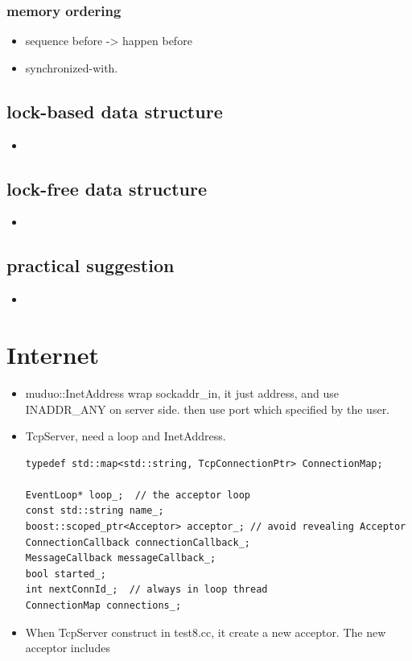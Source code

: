 \documentclass[a4paper,11pt,twoside]{book}
\begin{document}
\subsection{memory ordering}
\begin{itemize}
	\item sequence before -> happen before
	\item synchronized-with.
	
\end{itemize}


\section{lock-based data structure}
\begin{itemize}
	\item 
\end{itemize}

\section{lock-free data structure}
\begin{itemize}
	\item 
\end{itemize}

\section{practical suggestion}
\begin{itemize}
	\item 
\end{itemize}


\chapter{Internet}
\begin{itemize}
	\item muduo::InetAddress wrap sockaddr\_in, it just address, and use INADDR\_ANY on server side. then use port which specified by the user. 
	
	\item TcpServer, need a loop and InetAddress.
\begin{lstlisting}[numbers=none]
typedef std::map<std::string, TcpConnectionPtr> ConnectionMap;

EventLoop* loop_;  // the acceptor loop
const std::string name_;
boost::scoped_ptr<Acceptor> acceptor_; // avoid revealing Acceptor
ConnectionCallback connectionCallback_;
MessageCallback messageCallback_;
bool started_;
int nextConnId_;  // always in loop thread
ConnectionMap connections_;
\end{lstlisting}
	
	\item When TcpServer construct in test8.cc, it create a new acceptor. The new acceptor includes 
		
	
	
\end{itemize}
\end{document}
